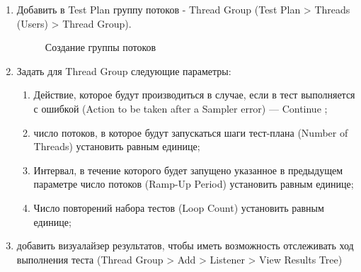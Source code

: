 \begin{enumerate}
\item Добавить в Test Plan группу потоков - Thread Group (Test Plan > Threads (Users) > Thread Group).

\begin{figure}[ht]
\caption{Создание группы потоков}
\label{ris:testplan.png}
\end{figure}

\item Задать для Thread Group следующие параметры:

\begin{enumerate}
\item Действие, которое будут производиться в случае, если в тест выполняется с ошибкой
(Action to be taken after a Sampler error) --- Continue ;
\item число потоков, в которое будут запускаться шаги тест-плана (Number of Threads) установить равным единице;
\item Интервал, в течение которого будет запущено указанное в предыдущем параметре
число потоков (Ramp-Up Period) установить равным единице;
\item Число повторений набора тестов (Loop Count) установить равным единице;
\end{enumerate}

\item добавить визуалайзер результатов, чтобы иметь возможность отслеживать ход выполнения теста (Thread Group >
Add > Listener > View Results Tree)
\end{enumerate}

